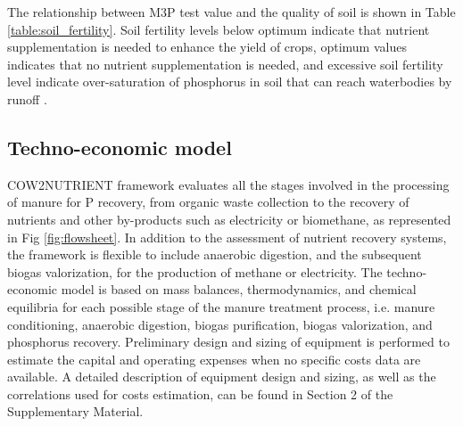 \begin{refsection}[referencesCh4]
The relationship between M3P test value and the quality of soil is shown in Table \ref{table:soil_fertility}. Soil fertility levels below optimum indicate that nutrient supplementation is needed to enhance the yield of crops, optimum values indicates that no nutrient supplementation is needed, and excessive soil fertility level indicate over-saturation of phosphorus in soil that can reach waterbodies by runoff \citep{Espinoza2006}.

\begin{table}[h]
	\centering
	\caption{Relationship between Mehlich 3 phosphorus and soil fertility level \protect\citep{Espinoza2006}.}
	\label{table:soil_fertility}
\end{table}

\subsection{Techno-economic model}
COW2NUTRIENT framework evaluates all the stages involved in the processing of manure for P recovery, from organic waste collection to the recovery of nutrients and other by-products such as electricity or biomethane, as represented in Fig \ref{fig:flowsheet}. In addition to the assessment of nutrient recovery systems, the framework is flexible to include anaerobic digestion, and the subsequent biogas valorization, for the production of methane or electricity. 
The techno-economic model is based on mass balances, thermodynamics, and chemical equilibria for each possible stage of the manure treatment process, i.e. manure conditioning, anaerobic digestion, biogas purification, biogas valorization, and phosphorus recovery. Preliminary design and sizing of equipment is performed to estimate the capital and operating expenses when no specific costs data are available. A detailed description of equipment design and sizing, as well as the correlations used for costs estimation, can be found in Section 2 of the Supplementary Material.


\end{refsection}
